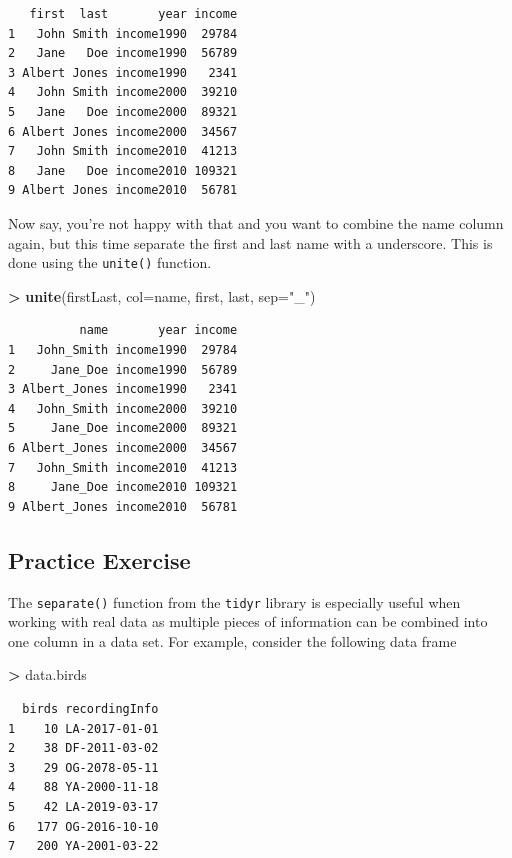 \documentclass[]{krantz}
\makeatletter
\newenvironment{Shaded}{\begin{snugshade}}{\end{snugshade}}
\newcommand{\KeywordTok}[1]{\textcolor[rgb]{0.27,0.27,0.27}{\textbf{#1}}}
\newcommand{\DataTypeTok}[1]{\textcolor[rgb]{0.27,0.27,0.27}{#1}}
\newcommand{\StringTok}[1]{\textcolor[rgb]{0.5,0.5,0.5}{#1}}
\newcommand{\OperatorTok}[1]{\textcolor[rgb]{0.43,0.43,0.43}{\textbf{#1}}}
\newcommand{\NormalTok}[1]{#1}
\newenvironment{kframe}{%
\medskip{}
\setlength{\fboxsep}{.8em}
 \def\at@end@of@kframe{}%
 \ifinner\ifhmode%
  \def\at@end@of@kframe{\end{minipage}}%
  \begin{minipage}{\columnwidth}%
 \fi\fi%
 \def\FrameCommand##1{\hskip\@totalleftmargin \hskip-\fboxsep
 \colorbox{shadecolor}{##1}\hskip-\fboxsep
     \hskip-\linewidth \hskip-\@totalleftmargin \hskip\columnwidth}%
 \MakeFramed {\advance\hsize-\width
   \@totalleftmargin\z@ \linewidth\hsize
   \@setminipage}}%
 {\par\unskip\endMakeFramed%
 \at@end@of@kframe}
\renewenvironment{Shaded}{\begin{kframe}}{\end{kframe}}
\makeatother
\begin{document}
\begin{verbatim}
   first  last       year income
1   John Smith income1990  29784
2   Jane   Doe income1990  56789
3 Albert Jones income1990   2341
4   John Smith income2000  39210
5   Jane   Doe income2000  89321
6 Albert Jones income2000  34567
7   John Smith income2010  41213
8   Jane   Doe income2010 109321
9 Albert Jones income2010  56781
\end{verbatim}

Now say, you're not happy with that and you want to combine the name
column again, but this time separate the first and last name with a
underscore. This is done using the \texttt{unite()} function.

\begin{Shaded}
\begin{Highlighting}[]
\OperatorTok{>}\StringTok{ }\KeywordTok{unite}\NormalTok{(firstLast, }\DataTypeTok{col=}\NormalTok{name, first, last, }\DataTypeTok{sep=}\StringTok{"_"}\NormalTok{)}
\end{Highlighting}
\end{Shaded}

\begin{verbatim}
          name       year income
1   John_Smith income1990  29784
2     Jane_Doe income1990  56789
3 Albert_Jones income1990   2341
4   John_Smith income2000  39210
5     Jane_Doe income2000  89321
6 Albert_Jones income2000  34567
7   John_Smith income2010  41213
8     Jane_Doe income2010 109321
9 Albert_Jones income2010  56781
\end{verbatim}

\subsection{Practice Exercise}\label{practice-exercise-7}

The \texttt{separate()} function from the \texttt{tidyr} library is
especially useful when working with real data as multiple pieces of
information can be combined into one column in a data set. For example,
consider the following data frame

\begin{Shaded}
\begin{Highlighting}[]
\OperatorTok{>}\StringTok{ }\NormalTok{data.birds}
\end{Highlighting}
\end{Shaded}

\begin{verbatim}
  birds recordingInfo
1    10 LA-2017-01-01
2    38 DF-2011-03-02
3    29 OG-2078-05-11
4    88 YA-2000-11-18
5    42 LA-2019-03-17
6   177 OG-2016-10-10
7   200 YA-2001-03-22
\end{verbatim}
\end{document}
